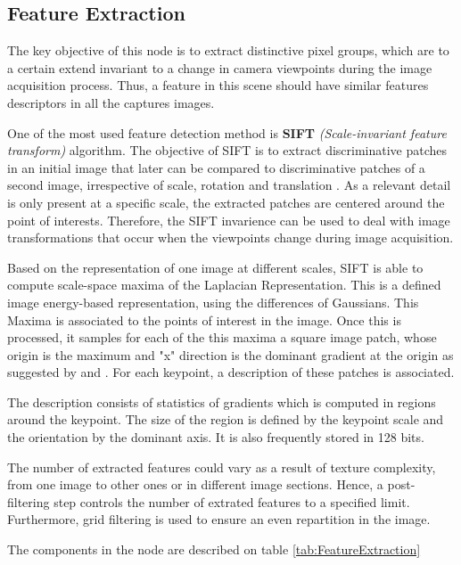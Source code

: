 \documentclass[12pt]{report}
\begin{document}
\subsection{Feature Extraction}
The key objective of this node is to extract distinctive pixel groups, which are to a certain extend invariant to a change in camera viewpoints during the image acquisition process.
Thus, a feature in this scene should have similar features descriptors in all the captures images.

One of the most used feature detection method is \textbf{SIFT} \textit{(Scale-invariant feature transform)} algorithm. 
The objective of SIFT is to extract discriminative patches in an initial image that later can be compared to discriminative patches of a second image, irrespective of scale, rotation and translation .
As a relevant detail is only present at a specific scale, the extracted patches are centered around the point of interests. 
Therefore, the SIFT invarience can be used to deal with image transformations that occur when the viewpoints change during image acquisition.

Based on the representation of one image at different scales, SIFT is able to compute scale-space maxima of the Laplacian Representation. This is a defined image energy-based representation, using the differences of Gaussians.
This Maxima is associated to the points of interest in the image. 
Once this is processed, it samples for each of the this maxima a square image patch, whose origin is the maximum and "x" direction is the dominant gradient at the origin as suggested by  and .
For each keypoint, a description of these patches is associated. 

The description consists of statistics of gradients which is computed in regions around the keypoint. The size of the region is defined by the keypoint scale and the orientation by the dominant axis.
 It is also frequently stored in 128 bits.
 \enlargethispage{\baselineskip}

The number of extracted features could vary as a result of texture complexity, from one image to other ones or in different image sections. Hence, a post-filtering step controls the number of extrated features to a specified limit. 
Furthermore, grid filtering is used to ensure an even repartition in the image.

The components in the node are described on table \ref{tab:FeatureExtraction}
\end{document}
